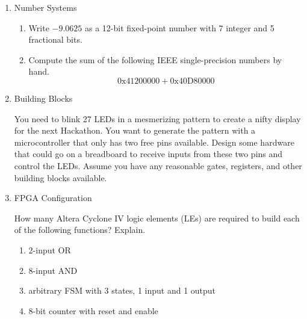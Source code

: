 \documentclass{ps}
\date{2019}
\author{}
\begin{document}
\begin{enumerate}
\item Number Systems
  \begin{enumerate}
  \item Write \(-9.0625\) as a 12-bit fixed-point number with 7
    integer and 5 fractional bits.
    \begin{solution}
    \end{solution}
  \item Compute the sum of the following IEEE single-precision numbers
    by hand.
    \[
      \mathrm{0x41200000} + \mathrm{0x40D80000}
    \]
    \begin{solution}
    \end{solution}
  \end{enumerate}

\item Building Blocks

  You need to blink 27 LEDs in a mesmerizing pattern to create a nifty
  display for the next Hackathon.  You want to generate the pattern
  with a microcontroller that only has two free pins available.
  Design some hardware that could go on a breadboard to receive inputs
  from these two pins and control the LEDs.  Assume you have any
  reasonable gates, registers, and other building blocks available.
  \begin{solution}
  \end{solution}

\item FPGA Configuration

  How many Altera Cyclone IV logic elements (LEs) are required to
  build each of the following functions?  Explain.
  \begin{enumerate}
  \item 2-input OR
    \begin{solution}
    \end{solution}
  \item 8-input AND
    \begin{solution}
    \end{solution}
  \item arbitrary FSM with 3 states, 1 input and 1 output
    \begin{solution}
    \end{solution}
  \item 8-bit counter with reset and enable
    \begin{solution}
    \end{solution}
  \end{enumerate}


\end{enumerate}
\end{document}
